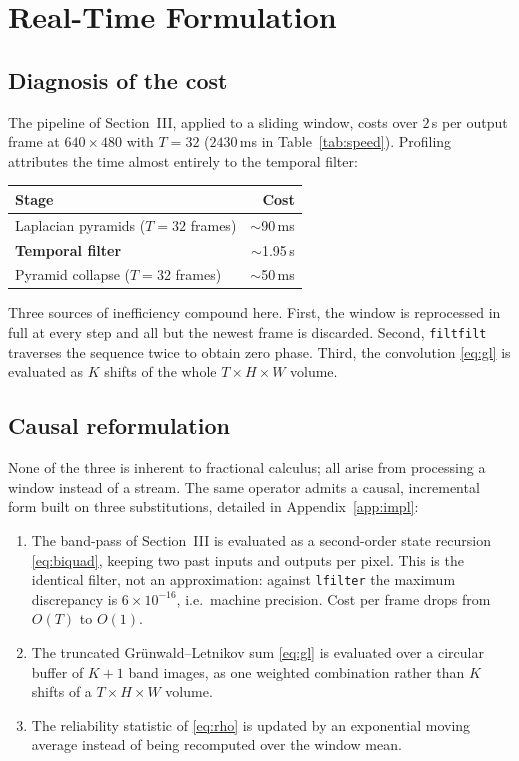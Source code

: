 \documentclass[conference]{IEEEtran}
\begin{document}
\section{Real-Time Formulation}

\subsection{Diagnosis of the cost}

The pipeline of Section~III, applied to a sliding window, costs over
$2$\,s per output frame at $640\times480$ with $T=32$ ($2430$\,ms in
Table~\ref{tab:speed}). Profiling attributes the time almost entirely to the
temporal filter:

\begin{center}
\begin{tabular}{lr}
\toprule
Stage & Cost \\
\midrule
Laplacian pyramids ($T=32$ frames) & $\sim$90\,ms \\
\textbf{Temporal filter} & $\mathbf{\sim}$1.95\,s \\
Pyramid collapse ($T=32$ frames) & $\sim$50\,ms \\
\bottomrule
\end{tabular}
\end{center}

Three sources of inefficiency compound here. First, the window is reprocessed
in full at every step and all but the newest frame is discarded. Second,
\texttt{filtfilt} traverses the sequence twice to obtain zero phase. Third,
the convolution \eqref{eq:gl} is evaluated as $K$ shifts of the whole
$T \times H \times W$ volume.

\subsection{Causal reformulation}

None of the three is inherent to fractional calculus; all arise from
processing a window instead of a stream. The same operator admits a causal,
incremental form built on three substitutions, detailed in
Appendix~\ref{app:impl}:

\begin{enumerate}
\item The band-pass of Section~III is evaluated as a second-order state
recursion \eqref{eq:biquad}, keeping two past inputs and outputs per pixel.
This is the identical filter, not an approximation: against \texttt{lfilter}
the maximum discrepancy is $6\times10^{-16}$, i.e.\ machine precision. Cost
per frame drops from $O(T)$ to $O(1)$.
\item The truncated Gr\"unwald--Letnikov sum \eqref{eq:gl} is evaluated over a
circular buffer of $K+1$ band images, as one weighted combination rather than
$K$ shifts of a $T \times H \times W$ volume.
\item The reliability statistic of \eqref{eq:rho} is updated by an
exponential moving average instead of being recomputed over the window mean.
\end{enumerate}
\end{document}
